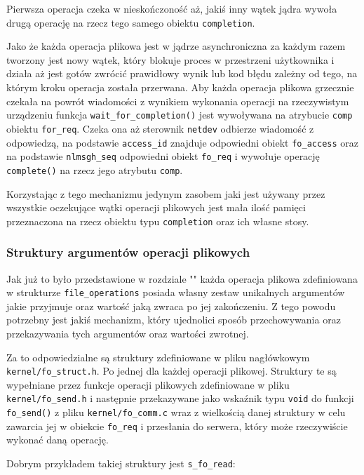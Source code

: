 \documentclass[10pt]{article}
\begin{document}
Pierwsza operacja czeka w nieskończoność aż, jakiś inny wątek jądra wywoła drugą operację na rzecz tego samego obiektu \texttt{completion}.

Jako że każda operacja plikowa jest w jądrze asynchroniczna za każdym razem tworzony jest nowy wątek, który blokuje proces w przestrzeni użytkownika i działa aż jest gotów zwrócić prawidłowy wynik lub kod błędu zależny od tego, na którym kroku operacja została przerwana. Aby każda operacja plikowa grzecznie czekała na powrót wiadomości z wynikiem wykonania operacji na rzeczywistym urządzeniu funkcja \texttt{wait\_for\_completion()} jest wywoływana na atrybucie \texttt{comp} obiektu \texttt{for\_req}. Czeka ona aż sterownik \texttt{netdev} odbierze wiadomość z odpowiedzą, na podstawie \texttt{access\_id} znajduje odpowiedni obiekt \texttt{fo\_access} oraz na podstawie \texttt{nlmsgh\_seq} odpowiedni obiekt \texttt{fo\_req} i wywołuje operację \texttt{complete()} na rzecz jego atrybutu \texttt{comp}.

Korzystając z tego mechanizmu jedynym zasobem jaki jest używany przez wszystkie oczekujące wątki operacji plikowych jest mała ilość pamięci przeznaczona na rzecz obiektu typu \texttt{completion} oraz ich własne stosy.

\subsubsection{Struktury argumentów operacji plikowych}

Jak już to było przedstawione w rozdziale "" każda operacja plikowa zdefiniowana w strukturze \texttt{file\_operations} posiada własny zestaw unikalnych argumentów jakie przyjmuje oraz wartość jaką zwraca po jej zakończeniu. Z tego powodu potrzebny jest jakiś mechanizm, który ujednolici sposób przechowywania oraz przekazywania tych argumentów oraz wartości zwrotnej.

Za to odpowiedzialne są struktury zdefiniowane w pliku nagłówkowym \texttt{kernel/fo\_struct.h}. Po jednej dla każdej operacji plikowej.  Struktury te są wypełniane przez funkcje operacji plikowych zdefiniowane w pliku \texttt{kernel/fo\_send.h} i następnie przekazywane jako wskaźnik typu \texttt{void} do funkcji \texttt{fo\_send()} z pliku \texttt{kernel/fo\_comm.c} wraz z wielkością danej struktury w celu zawarcia jej w obiekcie \texttt{fo\_req} i przesłania do serwera, który może rzeczywiście wykonać daną operację.

Dobrym przykładem takiej struktury jest \texttt{s\_fo\_read}:
\end{document}
